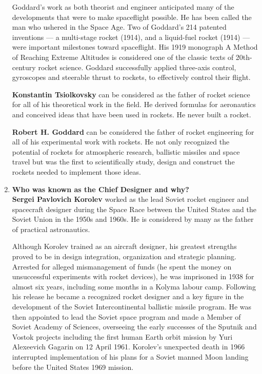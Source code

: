 \documentclass{article}
\begin{document}
\begin{enumerate}
Goddard's work as both theorist and engineer anticipated many of the developments that were to make spaceflight possible. He has been called the man who ushered in the Space Age. Two of Goddard's 214 patented inventions — a multi-stage rocket (1914), and a liquid-fuel rocket (1914) — were important milestones toward spaceflight. His 1919 monograph A Method of Reaching Extreme Altitudes is considered one of the classic texts of 20th-century rocket science. Goddard successfully applied three-axis control, gyroscopes and steerable thrust to rockets, to effectively control their flight. \cite{goddard}

{\bf Konstantin Tsiolkovsky} can be considered as the father of rocket science for all of his theoretical work in the field. He derived formulas for aeronautics and conceived ideas that have been used in rockets. He never built a rocket.

{\bf Robert H. Goddard} can be considered the father of rocket engineering for all of his experimental work with rockets. He not only recognized the potential of rockets for atmospheric research, ballistic missiles and space travel but was the first to scientifically study, design and construct the rockets needed to implement those ideas.

	\item {\bf Who was known as the Chief Designer and why?}\\
	
{\bf Sergei Pavlovich Korolev} worked as the lead Soviet rocket engineer and spacecraft designer during the Space Race between the United States and the Soviet Union in the 1950s and 1960s. He is considered by many as the father of practical astronautics.

Although Korolev trained as an aircraft designer, his greatest strengths proved to be in design integration, organization and strategic planning. Arrested for alleged mismanagement of funds (he spent the money on unsuccessful experiments with rocket devices), he was imprisoned in 1938 for almost six years, including some months in a Kolyma labour camp. Following his release he became a recognized rocket designer and a key figure in the development of the Soviet Intercontinental ballistic missile program. He was then appointed to lead the Soviet space program and made a Member of Soviet Academy of Sciences, overseeing the early successes of the Sputnik and Vostok projects including the first human Earth orbit mission by Yuri Alexeevich Gagarin on 12 April 1961. Korolev's unexpected death in 1966 interrupted implementation of his plans for a Soviet manned Moon landing before the United States 1969 mission.


\end{enumerate}
\end{document}
